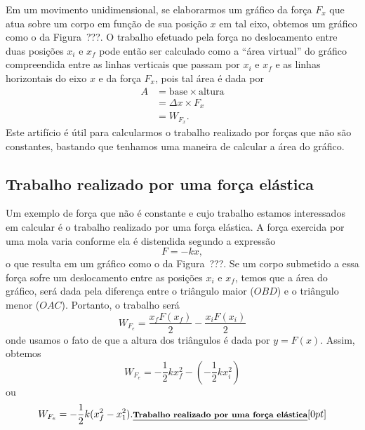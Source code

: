 Em um movimento unidimensional, se elaborarmos um gráfico da força $F_x$ que atua sobre um corpo em função de sua posição $x$ em tal eixo, obtemos um gráfico como o da Figura~???. 
O trabalho efetuado pela força no deslocamento entre duas posições $x_i$ e $x_f$ pode então ser calculado como a ``área virtual'' do gráfico compreendida entre as linhas verticais que passam por $x_i$ e $x_f$ e as linhas horizontais do eixo $x$ e da força $F_x$, pois tal área é dada por
\begin{align}
  A &= \textrm{base} \times \textrm{altura} \\
  &= \Delta x \times F_x \\
  &= W_{F_x}.
\end{align}
%
Este artifício é útil para calcularmos o trabalho realizado por forças que não são constantes, bastando que tenhamos uma maneira de calcular a área do gráfico.

\subsection{Trabalho realizado por uma força elástica}

Um exemplo de força que não é constante e cujo trabalho estamos interessados em calcular é o trabalho realizado por uma força elástica. A força exercida por uma mola varia conforme ela é distendida segundo a expressão
\begin{equation}
  F = -k x,
\end{equation}
%
o que resulta em um gráfico como o da Figura~???. Se um corpo submetido a essa força sofre um deslocamento entre as posições $x_i$ e $x_f$, temos que a área do gráfico, será dada pela diferença entre o triângulo maior ($OBD$) e o triângulo menor ($OAC$). Portanto, o trabalho será 
\begin{equation}
  W_{F_e} = \frac{x_f F(x_f)}{2} - \frac{x_i F(x_i)}{2}
\end{equation}
%
onde usamos o fato de que a altura dos triângulos é dada por $y = F(x)$. Assim, obtemos
\begin{equation}
  W_{F_e} = -\frac{1}{2} k x_f^2 - \left(-\frac{1}{2} k x_i^2 \right)
\end{equation}
%
ou
\begin{equation}\label{Eq:TrabalhoForcaElastica}
  W_{F_e} = - \frac{1}{2} k (x_f^2 - x_1^2). \relax{\footnotesize\emph{\textbf{Trabalho realizado por uma força elástica}}}[0pt]
\end{equation}

